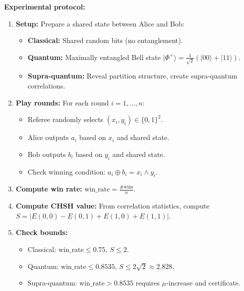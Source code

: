 \textbf{Experimental protocol:}
\begin{enumerate}
    \item \textbf{Setup:} Prepare a shared state between Alice and Bob:
    \begin{itemize}
        \item \textbf{Classical:} Shared random bits (no entanglement).
        \item \textbf{Quantum:} Maximally entangled Bell state $|\Phi^+\rangle = \frac{1}{\sqrt{2}}(|00\rangle + |11\rangle)$.
        \item \textbf{Supra-quantum:} Reveal partition structure, create supra-quantum correlations.
    \end{itemize}
    
    \item \textbf{Play rounds:} For each round $i = 1, \ldots, n$:
    \begin{itemize}
        \item Referee randomly selects $(x_i, y_i) \in \{0,1\}^2$.
        \item Alice outputs $a_i$ based on $x_i$ and shared state.
        \item Bob outputs $b_i$ based on $y_i$ and shared state.
        \item Check winning condition: $a_i \oplus b_i = x_i \land y_i$.
    \end{itemize}
    
    \item \textbf{Compute win rate:} $\text{win\_rate} = \frac{\#\text{wins}}{n}$.
    
    \item \textbf{Compute CHSH value:} From correlation statistics, compute $S = |E(0,0) - E(0,1) + E(1,0) + E(1,1)|$.
    
    \item \textbf{Check bounds:}
    \begin{itemize}
        \item Classical: $\text{win\_rate} \leq 0.75$, $S \leq 2$.
        \item Quantum: $\text{win\_rate} \leq 0.8535$, $S \leq 2\sqrt{2} \approx 2.828$.
        \item Supra-quantum: $\text{win\_rate} > 0.8535$ requires $\mu$-increase and certificate.
    \end{itemize}
\end{enumerate}

